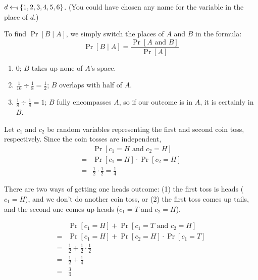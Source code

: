 \begin{answer}
    $d \hskip2.3pt{\gets\!\!\mbox{\tiny${\$}$\normalsize}}\, \{1, 2, 3, 4, 5, 6\}$. (You could have chosen any name for the variable in the place of $d$.)
\end{answer}

\begin{answer}
    To find $\Pr[B \mid A]$, we simply switch the places of $A$ and $B$ 
    in the formula:
    \[
        \Pr[B \mid A] = \frac{\Pr[A \text{ and } B]}{\Pr[A]}
    \]
    \renewcommand{\labelenumi}{(\alph{enumi})} 
    \begin{enumerate}
        \item 0; $B$ takes up none of $A$'s space.
        \item $\frac{1}{16} \div \frac{1}{8} = \frac{1}{2}$; $B$ overlaps 
        with half of $A$.
        \item $\frac{1}{8} \div \frac{1}{8} = 1$; $B$ fully encompasses $A$, so if our 
        outcome is in $A$, it is certainly in $B$.
    \end{enumerate}
\end{answer}

\begin{answer}
    Let $c_1$ and $c_2$ be random variables representing the first and second
    coin toss, respectively. Since the coin tosses are independent, 
    \begin{align*}
        & \Pr[c_1=H \text{ and } c_2=H]\\
        =& \Pr[c_1=H] \cdot \Pr[c_2=H]\\
        =& \frac{1}{2} \cdot \frac{1}{2} = \frac{1}{4}
    \end{align*}
\end{answer}

\begin{answer}
    There are two ways of getting one heads outcome: (1) the first toss is heads 
    ($c_1=H$), and we don't do another coin toss, or (2) the first toss comes up tails,
    and the second one comes up heads ($c_1=T$ and $c_2=H$). 
    
    \begin{align*}
        & \Pr[c_1=H] + \Pr[c_1=T \text{ and } c_2=H]\\
        =& \Pr[c_1=H] + \Pr[c_2=H] \cdot \Pr[c_1=T] 
        \tag{coin tosses are independent events}\\
        =& \frac{1}{2} + \frac{1}{2}\cdot\frac{1}{2}\\
        =& \frac{1}{2} + \frac{1}{4}\\
        =& \frac{3}{4}
    \end{align*}
\end{answer}

